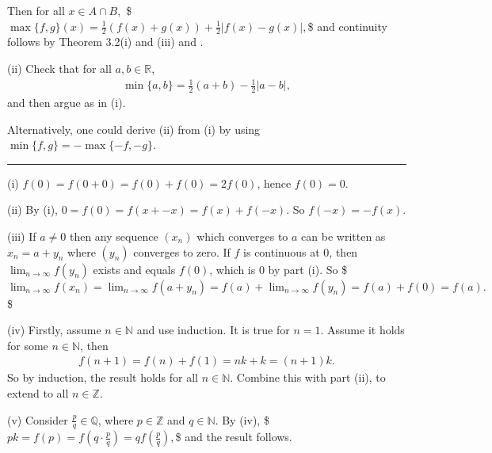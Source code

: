 \documentclass[letterpaper,10pt,english]{jupyterBook}
\begin{document}
\sphinxAtStartPar
Then for all \(x \in A\cap B,\)
\$\(
\max\{f, g\}(x) = \frac{1}{2}(f(x) + g(x)) + \frac{1}{2}|f(x) - g(x)|,
\)\$
and continuity follows by Theorem  3.2(i) and (iii) and {\hyperref[\detokenize{Problems:id14}]{}}.

\sphinxAtStartPar
(ii) Check that for all \(a, b \in \mathbb{R}\),
\begin{equation*}
\begin{split}
\min\{a, b\} = \frac{1}{2}(a + b) - \frac{1}{2}|a - b|,
\end{split}
\end{equation*}
\sphinxAtStartPar
and then argue as in (i).

\sphinxAtStartPar
Alternatively, one could derive (ii) from (i) by using \(\min\{f,g\} = - \max\{-f, -g\}\).


\bigskip\hrule\bigskip


\sphinxAtStartPar
{\hyperref[\detokenize{Problems:id21}]{}}
(i) \(f(0) = f(0 + 0) = f(0) + f(0) = 2f(0)\), hence \(f(0) = 0\).

\sphinxAtStartPar
(ii) By (i), \(0 = f(0) = f(x + -x) = f(x) + f(-x)\). So \(f(-x)=-f(x)\).

\sphinxAtStartPar
(iii) If \(a \neq 0\) then any sequence \((x_{n})\) which converges to \(a\) can be written as \(x_{n} = a + y_{n}\) where \((y_{n})\) converges to zero. If \(f\) is continuous at \(0\), then \( \lim_{n\rightarrow\infty} f(y_{n})\) exists and equals \(f(0)\), which is \(0\) by part (i). So
\$\(
\lim_{n\rightarrow\infty} f(x_{n}) = \lim_{n\rightarrow\infty} f(a + y_{n}) = f(a) + \lim_{n\rightarrow\infty} f(y_{n}) = f(a) + f(0) = f(a).
\)\$

\sphinxAtStartPar
(iv) Firstly, assume \(n\in\mathbb{N}\) and use induction. It is true for \(n = 1\). Assume it holds for some \(n\in\mathbb{N}\), then
\begin{equation*}
\begin{split}
f(n+1) = f(n) + f(1) = nk + k = (n+1)k.
\end{split}
\end{equation*}
\sphinxAtStartPar
So by induction, the result holds for all \(n\in\mathbb{N}\).
Combine this with part (ii), to extend to all \(n\in \mathbb{Z}\).

\sphinxAtStartPar
(v) Consider \(\frac{p}{q}\in\mathbb{Q}\), where \(p\in \mathbb{Z}\) and \(q\in \mathbb{N}\). By (iv),
\$\(
pk = f(p) = f\left(q\cdot \frac{p}{q}\right) = qf\left(\frac{p}{q}\right),
\)\$ and the result follows.
\end{document}

